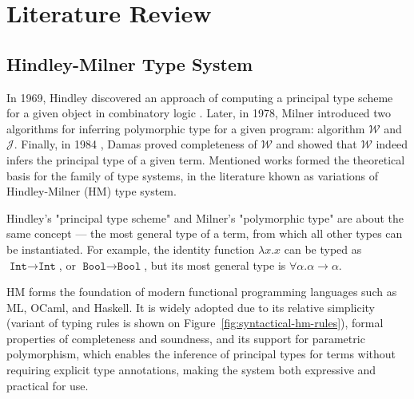 \chapter{Literature Review}
\label{chap:lr}

\section{Hindley-Milner Type System}

In 1969, Hindley discovered an approach of computing a principal type scheme for a given object in combinatory logic \cite{Hindley1969_PrincipalTypeScheme}. Later, in 1978, Milner introduced two algorithms for inferring polymorphic type for a given program: algorithm $\mathcal{W}$ and $\mathcal{J}$\cite{Milner1978_TypePolymorphism}. Finally, in 1984 \cite{Damas1984_TypeAssignment}, Damas proved completeness of $\mathcal{W}$ and showed that $\mathcal{W}$ indeed infers the principal type of a given term. Mentioned works formed the theoretical basis for the family of type systems, in the literature khown as variations of Hindley-Milner (HM) type system.

Hindley's "principal type scheme" and Milner's "polymorphic type" are about the same concept — the most general type of a term, from which all other types can be instantiated. For example, the identity function $\lambda x. x$ can be typed as $\texttt{Int} \to \texttt{Int}$, or $\texttt{Bool} \to \texttt{Bool}$, but its most general type is $\forall \alpha. \alpha \to \alpha$.

HM forms the foundation of modern functional programming languages such as ML, OCaml, and Haskell. It is widely adopted due to its relative simplicity (variant of typing rules is shown on Figure~\ref{fig:syntactical-hm-rules}), formal properties of completeness and soundness, and its support for parametric polymorphism, which enables the inference of principal types for terms without requiring explicit type annotations, making the system both expressive and practical for use.

